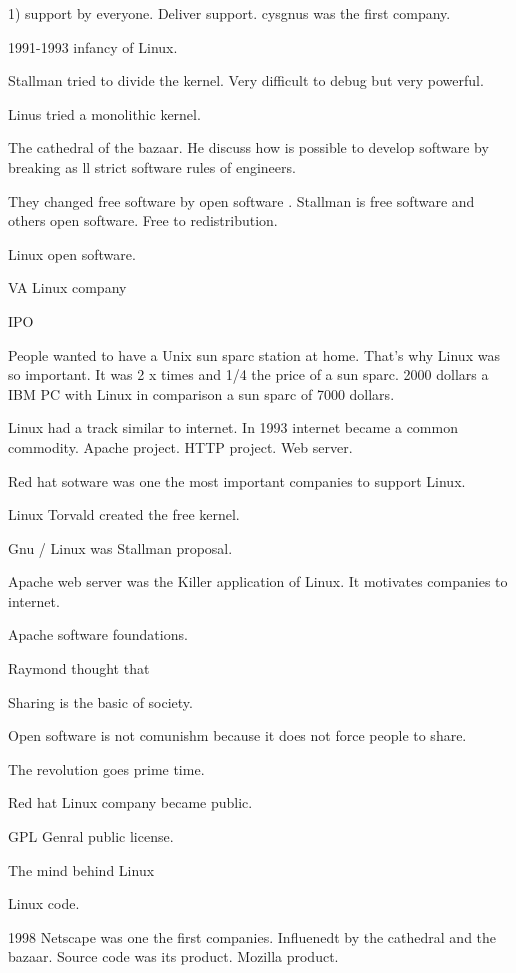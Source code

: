  1) support by everyone. Deliver support. 
  cysgnus was the first company. 
  
  1991-1993 infancy of Linux. 
  
  Stallman tried to divide the kernel. Very difficult to debug but very powerful. 
  
  Linus tried a monolithic kernel. 
  
  
  
  The cathedral of the bazaar. He discuss how is possible to develop software by breaking as ll strict software rules of engineers.  
  
  
  They changed free software by open software .
  Stallman is free software and others open software. Free to redistribution. 
  
  Linux open software.
  
  VA Linux company 
  
  IPO 
  
  People wanted to have a Unix sun sparc station at home. That's why Linux was so important.
  It was 2 x times and 1/4 the price of a sun sparc. 
  2000 dollars a IBM PC with Linux in comparison a sun sparc of 7000 dollars. 
  
  Linux had a track similar to internet. In 1993 internet became a common commodity. 
  Apache project. HTTP project. Web server. 
  
  Red hat sotware was one the most important companies to support Linux. 
  
  Linux Torvald created the free kernel. 
  
  
  
  Gnu / Linux was Stallman proposal. 
  
  Apache web server was the Killer application of Linux. It motivates companies to internet. 
  
  Apache software foundations. 
  
  Raymond thought that 
  
  
  Sharing is the basic of society. 
  
  Open software is not comunishm because it does not force people to share. 
  
  The revolution goes prime time. 
  
  Red hat Linux company became public. 
  
  
  GPL Genral public license. 
  
  
  The mind behind Linux 
  
  Linux code. 
  
  
  1998 Netscape was one the first companies.
  Influenedt by the cathedral and the bazaar. 
  Source code was its product. Mozilla product. 
  
